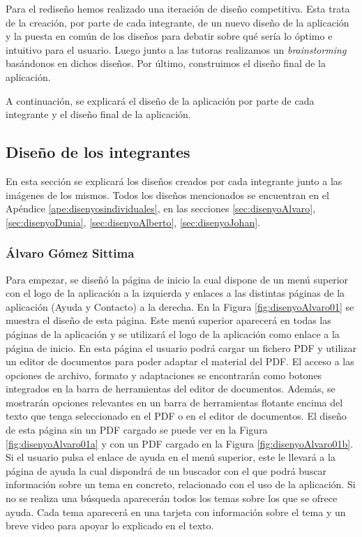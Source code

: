 Para el rediseño hemos realizado una iteración de diseño competitiva. Esta trata de la creación, por parte de cada integrante, de un nuevo diseño de la aplicación y la puesta en común de los diseños para debatir sobre qué sería lo óptimo e intuitivo para el usuario. Luego junto a las tutoras realizamos un \textit{brainstorming} basándonos en dichos diseños. Por último, construimos el diseño final de la aplicación.

A continuación, se explicará el diseño de la aplicación por parte de cada integrante y el diseño final de la aplicación.
\subsection{Diseño de los integrantes}
En esta sección se explicará los diseños creados por cada integrante junto a las imágenes de los mismos. Todos los diseños mencionados se encuentran en el Apéndice \ref{ape:disenyosindividuales}, en las secciones \ref{sec:disenyoAlvaro}, \ref{sec:disenyoDunia}, \ref{sec:disenyoAlberto}, \ref{sec:disenyoJohan}.

\subsubsection{Álvaro Gómez Sittima}
Para empezar, se diseñó la página de inicio la cual dispone de un menú superior con el logo de la aplicación a la izquierda y enlaces a las distintas páginas de la aplicación (Ayuda y Contacto) a la derecha. En la Figura \ref{fig:disenyoAlvaro01} se muestra el diseño de esta página. Este menú superior aparecerá en todas las páginas de la aplicación y se utilizará el logo de la aplicación como enlace a la página de inicio. En esta página el usuario podrá cargar un fichero PDF y utilizar un editor de documentos para poder adaptar el material del PDF. El acceso a las opciones de archivo, formato y adaptaciones se encontrarán como botones integrados en la barra de herramientas del editor de documentos. Además, se mostrarán opciones relevantes en un barra de herramientas flotante encima del texto que tenga seleccionado en el PDF o en el editor de documentos. El diseño de esta página sin un PDF cargado se puede ver en la Figura \ref{fig:disenyoAlvaro01a} y con un PDF cargado en la Figura \ref{fig:disenyoAlvaro01b}. Si el usuario pulsa el enlace de ayuda en el menú superior, este le llevará a la página de ayuda la cual dispondrá de un buscador con el que podrá buscar información sobre un tema en concreto, relacionado con el uso de la aplicación. Si no se realiza una búsqueda aparecerán todos los temas sobre los que se ofrece ayuda. Cada tema aparecerá en una tarjeta con información sobre el tema y un breve video para apoyar lo explicado en el texto.

